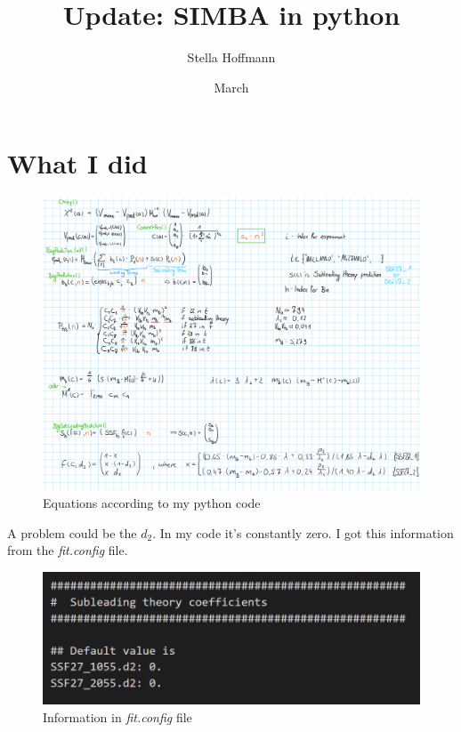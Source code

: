 \documentclass[a4paper,12pt]{article}
\title{Update: SIMBA in python}
\author{Stella Hoffmann}
\date{March}
\begin{document}
\maketitle

\tableofcontents

\newpage

\section{What I did}
\begin{figure}[H]
    \centering
    \includegraphics[scale=0.3]{equations.png}
    \caption{Equations according to my python code}
\end{figure}

A problem could be the $d_2$. In my code it's constantly zero. I got this information from the \textit{fit.config} file.
\begin{figure}[H]
    \centering
    \includegraphics[scale=0.3]{d2_fit_config.png}
    \caption{Information in \textit{fit.config} file}
\end{figure}
\end{document}
